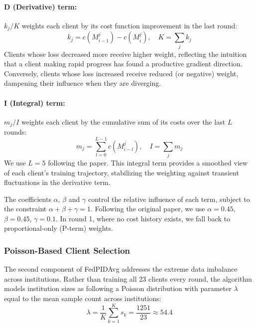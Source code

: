 \documentclass{article}
\begin{document}
\paragraph{D (Derivative) term:} $k_j / K$ weights each client by its cost function improvement in the last round:
\begin{equation}
    k_j = c(M_{i-1}^j) - c(M_i^j), \quad K = \sum_j k_j
\end{equation}
Clients whose loss decreased more receive higher weight, reflecting the intuition that a client making rapid progress has found a productive gradient direction. Conversely, clients whose loss increased receive reduced (or negative) weight, dampening their influence when they are diverging.

\paragraph{I (Integral) term:} $m_j / I$ weights each client by the cumulative sum of its costs over the last $L$ rounds:
\begin{equation}
    m_j = \sum_{l=0}^{L-1} c(M_{i-l}^j), \quad I = \sum_j m_j
\end{equation}
We use $L = 5$ following the paper. This integral term provides a smoothed view of each client's training trajectory, stabilizing the weighting against transient fluctuations in the derivative term.

The coefficients $\alpha$, $\beta$ and $\gamma$ control the relative influence of each term, subject to the constraint $\alpha + \beta + \gamma = 1$. Following the original paper, we use $\alpha = 0.45$, $\beta = 0.45$, $\gamma = 0.1$. In round 1, where no cost history exists, we fall back to proportional-only (P-term) weights.

\subsubsection{Poisson-Based Client Selection}

The second component of FedPIDAvg addresses the extreme data imbalance across institutions. Rather than training all 23 clients every round, the algorithm models institution sizes as following a Poisson distribution with parameter $\lambda$ equal to the mean sample count across institutions:
\begin{equation}
    \lambda = \frac{1}{K} \sum_{k=1}^{K} s_k = \frac{1251}{23} \approx 54.4
\end{equation}
\end{document}
